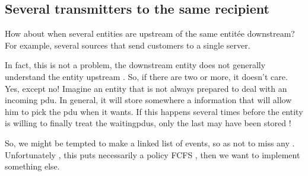 \subsection{Several transmitters to the same recipient}

   How about when several entities are upstream of the same
entitée downstream? For example, several sources that send customers
to a single server.

   In fact, this is not a problem, the downstream entity does not generally understand the entity upstream . So, if there are two or more, it doesn't care. 
Yes, except no! Imagine an entity that is not always prepared to deal with an
incoming {\sc pdu}. In general, it will store somewhere a
information that will allow him to pick the {\sc pdu} when it wants. 
If this happens several times before the entity is willing to finally treat the waiting{\sc pdu}s, only the last may have been stored !

   So, we might be tempted to make a linked list of
events, so as not to miss any . Unfortunately , this puts
necessarily a policy {\sc FCFS }, then we want to implement something else.

